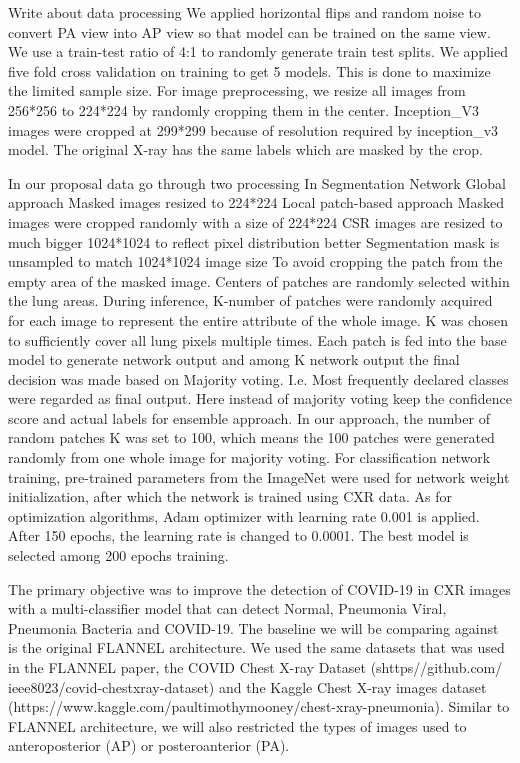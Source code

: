 \documentclass{sigkddExp}
\begin{document}
Write about data processing
We applied horizontal flips and random noise to convert PA view into AP view so
that model can be trained on the same view. We use a train-test ratio of 4:1 to
randomly generate train test splits. We applied five fold cross validation on
training to get 5 models. This is done to maximize the limited sample size. For
image preprocessing, we resize all images from 256*256 to 224*224 by randomly
cropping them in the center. Inception\_V3 images were cropped at 299*299 because
of resolution required by inception\_v3 model. The original X-ray has the same
labels which are masked by the crop.

In our proposal data go through two processing In Segmentation Network Global
approach Masked images resized to 224*224 Local patch-based approach Masked
images were cropped randomly with a size of 224*224 CSR images are resized to
much bigger 1024*1024 to reflect pixel distribution better Segmentation mask is
unsampled to match 1024*1024 image size To avoid cropping the patch from the
empty area of the masked image. Centers of patches are randomly selected within
the lung areas. During inference, K-number of patches were randomly acquired for
each image to represent the entire attribute of the whole image. K was chosen to
sufficiently cover all lung pixels multiple times. Each patch is fed into the
base model to generate network output and among K network output the final
decision was made based on Majority voting. I.e. Most frequently declared
classes were regarded as final output. Here instead of majority voting keep the
confidence score and actual labels for ensemble approach. In our approach, the
number of random patches K was set to 100, which means the 100 patches were
generated randomly from one whole image for majority voting. For classification
network training, pre-trained parameters from the ImageNet were used for network
weight initialization, after which the network is trained using CXR data. As for
optimization algorithms, Adam optimizer with learning rate 0.001 is applied.
After 150 epochs, the learning rate is changed to 0.0001. The best model is
selected among 200 epochs training.

The primary objective was to improve the detection of COVID-19 in CXR images
with a multi-classifier model that can detect Normal, Pneumonia Viral, Pneumonia
Bacteria and COVID-19. The baseline we will be comparing against is the original
FLANNEL architecture. We used the same datasets that was used in the FLANNEL
paper, the COVID Chest X-ray Dataset (shttps\://github.com/
ieee8023/covid-chestxray-dataset) and the Kaggle Chest X-ray images dataset
(https://www.kaggle.com/paultimothymooney/chest-xray-pneumonia). Similar to
FLANNEL architecture, we will also restricted the types of images used to
anteroposterior (AP) or posteroanterior (PA).
\end{document}
